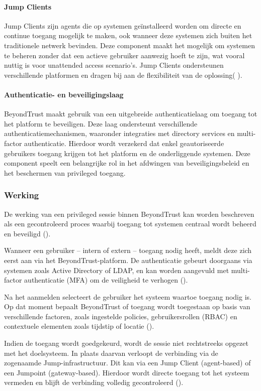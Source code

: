 \paragraph{Jump Clients}
Jump Clients zijn agents die op systemen geïnstalleerd worden om directe en continue toegang mogelijk te maken, ook wanneer deze systemen zich buiten het traditionele netwerk bevinden. Deze component maakt het mogelijk om systemen te beheren zonder dat een actieve gebruiker aanwezig hoeft te zijn, wat vooral nuttig is voor unattended access scenario’s. Jump Clients ondersteunen verschillende platformen en dragen bij aan de flexibiliteit van de oplossing( \cite{beyondtrust_jumpclient}).
\paragraph{Authenticatie- en beveiligingslaag}
BeyondTrust maakt gebruik van een uitgebreide authenticatielaag om toegang tot het platform te beveiligen. Deze laag ondersteunt verschillende authenticatiemechanismen, waaronder integraties met directory services en multi-factor authenticatie. Hierdoor wordt verzekerd dat enkel geautoriseerde gebruikers toegang krijgen tot het platform en de onderliggende systemen. Deze component speelt een belangrijke rol in het afdwingen van beveiligingsbeleid en het beschermen van privileged toegang.

\subsubsection{Werking}
De werking van een privileged sessie binnen BeyondTrust kan worden beschreven als een gecontroleerd proces waarbij toegang tot systemen centraal wordt beheerd en beveiligd (\cite{beyondtrust_architecture}).

Wanneer een gebruiker – intern of extern – toegang nodig heeft, meldt deze zich eerst aan via het BeyondTrust-platform. De authenticatie gebeurt doorgaans via systemen zoals Active Directory of LDAP, en kan worden aangevuld met multi-factor authenticatie (MFA) om de veiligheid te verhogen (\cite{beyondtrust_authentication}).

Na het aanmelden selecteert de gebruiker het systeem waartoe toegang nodig is. Op dat moment bepaalt BeyondTrust of toegang wordt toegestaan op basis van verschillende factoren, zoals ingestelde policies, gebruikersrollen (RBAC) en contextuele elementen zoals tijdstip of locatie (\cite{beyondtrust_architecture}).

Indien de toegang wordt goedgekeurd, wordt de sessie niet rechtstreeks opgezet met het doelsysteem. In plaats daarvan verloopt de verbinding via de zogenaamde Jump-infrastructuur. Dit kan via een Jump Client (agent-based) of een Jumpoint (gateway-based). Hierdoor wordt directe toegang tot het systeem vermeden en blijft de verbinding volledig gecontroleerd (\cite{beyondtrust_jumpclient,beyondtrust_jumpoint}).

